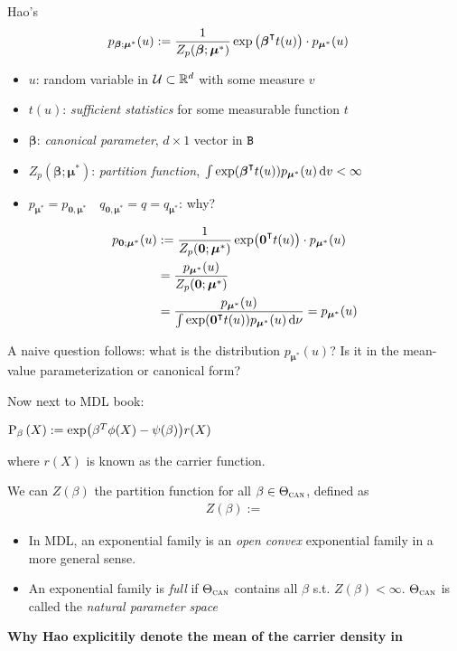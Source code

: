 Hao's
\begin{align}
    &p_{\bm{\beta}; \bm{\mu}^*}(u) := \frac{1}{Z_p(\bm{\beta}; \bm{\mu}^*)} 
        \exp\left( \bm{\beta}^\transpose t(u) \right) \cdot p_{\bm{\mu}^*}(u)
\end{align}
\begin{itemize}
    \item $u$: random variable in $\mathcal{U} \subset \mathbb{R}^d$ with some measure $v$
    \item $t(u)$: \textit{sufficient statistics} for some measurable function $t$
    \item $\bm{\beta}$: \textit{canonical parameter}, $d \times 1 $ vector in $\mathtt{B}$
    \item $Z_p(\bm{\beta}; \bm{\mu}^*)$: \textit{partition function}, 
        $\int \exp(\bm{\beta}^\transpose t(u)) p_{\bm{\mu}^*}(u)\dd{v} < \infty$
    \item $p_{\bm{\mu}^*} = p_{\bm{0}, \bm{\mu}^*} \quad q_{\bm{0},\bm{\mu}^*} = q = q_{\bm{\mu}^*}$: why?
\end{itemize}

\begin{align}
    p_{\bm{0};\bm{\mu}^*}(u) &:= 
        \frac{1}{Z_p(\bm{0};\bm{\mu}^*)}\exp(\bm{0}^\transpose t(u))\cdot p_{\bm{\mu}^*}(u) \\
        &= \frac{p_{\bm{\mu}^*}(u)}{Z_p(\bm{0};\bm{\mu}^*)} \\
        &= \frac{p_{\bm{\mu}^*}(u)}{\int\exp(\bm{0}^\transpose t(u)) p_{\bm{\mu}^*}(u)\dd{\nu}} 
        = p_{\bm{\mu}^*}(u)
\end{align}

A naive question follows: what is the distribution $p_{\bm{\mu}^*}(u)$? 
Is it in the mean-value parameterization or canonical form?

Now next to MDL book:


\begin{define}
$\operatorname{\mathrm{P}}_{\beta} \left( {X} \right) := \exp(\beta^T\phi(X) - \psi(\beta)) r(X)$
\end{define}
where $r(X)$ is known as the carrier function.

We can $Z(\beta)$ the partition function for all $\beta \in \Theta_{\textsc{can}}$,
defined as 
\begin{align*}
    Z(\beta) := 
\end{align*} 



\begin{itemize}
    \item In MDL, an exponential family is an \textit{open convex} exponential family 
        in a more general sense.
    \item An exponential family is \textit{full} 
        if $\Theta_{\textsc{can}}$ contains all $\beta$ s.t. $Z(\beta) < \infty$.
        $\Theta_{\textsc{can}}$ is called the \textit{natural parameter space}
\end{itemize}



\textbf{Why Hao explicitily denote the mean of the carrier density in \cite{grunwaldSafeTesting2024}}
